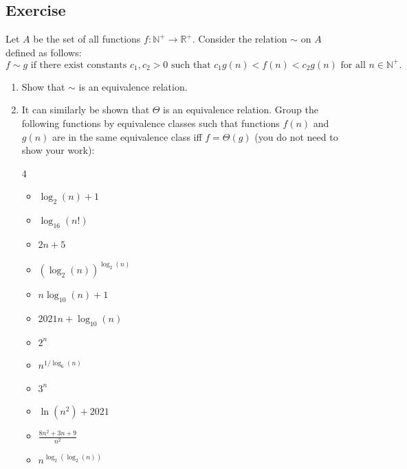 \documentclass{article}
\newcounter{counter}
\newcommand{\Exercise}{Exercise \stepcounter{counter}\thecounter}
\begin{document}
\subsection*{\Exercise}
    Let $A$ be the set of all functions $f: \mathbb{N}^{+} \rightarrow \mathbb{R}^{+}$. Consider the relation $\sim$ on $A$ defined as follows: $$\text{$f \sim g$ if there exist constants $c_{1}, c_{2} > 0$ such that $c_{1}g(n) < f(n) < c_{2}g(n)$ for all $n \in \mathbb{N}^{+}$.}$$
    \begin{enumerate}
        \item Show that $\sim$ is an equivalence relation.
        \item It can similarly be shown that $\Theta$ is an equivalence relation. Group the following functions by equivalence classes such that functions $f(n)$ and $g(n)$ are in the same equivalence class iff $f = \Theta(g)$ (you do not need to show your work): 
        \begin{multicols}{4}
        \begin{itemize}
            \item $\log_{2}(n) + 1$
            \item $\log_{16}(n!)$
            \item $2n + 5$
            \item $(\log_{2}(n))^{\log_{2}(n)}$
            \item $n\log_{10}(n) + 1$
            \item $2021n + \log_{10}(n)$
            \item $2^{n}$
            \item $n^{1/\log_{6}(n)}$
            \item $3^{n}$
            \item $\ln(n^{2}) + 2021$
            \item $\frac{8n^{2} + 3n + 9}{n^{2}}$
            \item $n^{\log_{2}(\log_{2}(n))}$
        \end{itemize}
        \end{multicols}
    \end{enumerate}
\end{document}
